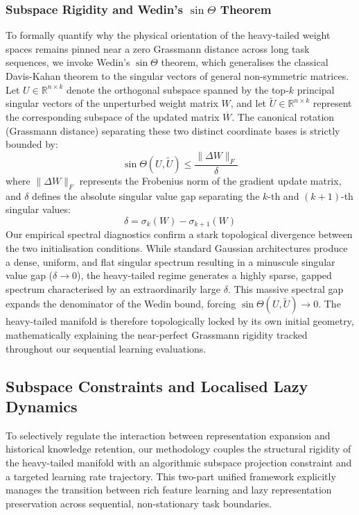 \documentclass[10pt,a4paper]{article}
\begin{document}
	\subsubsection{Subspace Rigidity and Wedin's $\sin\Theta$ Theorem}
	To formally quantify why the physical orientation of the heavy-tailed weight spaces remains pinned near a zero Grassmann distance across long task sequences, we invoke Wedin's $\sin\Theta$ theorem, which generalises the classical Davis-Kahan theorem to the singular vectors of general non-symmetric matrices. Let $U \in \mathbb{R}^{n \times k}$ denote the orthogonal subspace spanned by the top-$k$ principal singular vectors of the unperturbed weight matrix $W$, and let $\tilde{U} \in \mathbb{R}^{n \times k}$ represent the corresponding subspace of the updated matrix $\overline{W}$. The canonical rotation (Grassmann distance) separating these two distinct coordinate bases is strictly bounded by:
	\begin{equation}
		\sin\Theta(U, \tilde{U}) \le \frac{\|\Delta W\|_F}{\delta}
	\end{equation}
	where $\|\Delta W\|_F$ represents the Frobenius norm of the gradient update matrix, and $\delta$ defines the absolute singular value gap separating the $k$-th and $(k+1)$-th singular values:
	\begin{equation}
		\delta = \sigma_k(W) - \sigma_{k+1}(W)
	\end{equation}
	Our empirical spectral diagnostics confirm a stark topological divergence between the two initialisation conditions. While standard Gaussian architectures produce a dense, uniform, and flat singular spectrum resulting in a minuscule singular value gap ($\delta \rightarrow 0$), the heavy-tailed regime generates a highly sparse, gapped spectrum characterised by an extraordinarily large $\delta$. This massive spectral gap expands the denominator of the Wedin bound, forcing $\sin\Theta(U, \tilde{U}) \rightarrow 0$. The heavy-tailed manifold is therefore topologically locked by its own initial geometry, mathematically explaining the near-perfect Grassmann rigidity tracked throughout our sequential learning evaluations.
	\subsection{Subspace Constraints and Localised Lazy Dynamics}
	
	To selectively regulate the interaction between representation expansion and historical knowledge retention, our methodology couples the structural rigidity of the heavy-tailed manifold with an algorithmic subspace projection constraint and a targeted learning rate trajectory. This two-part unified framework explicitly manages the transition between rich feature learning and lazy representation preservation across sequential, non-stationary task boundaries.
	
\end{document}
